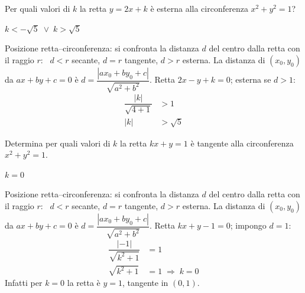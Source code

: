 \begin{question}[ID=3.8, subtitle={Valori di $k$ per cui $y=2x+k$ è esterna a $x^2+y^2=1$}, difficulty=media, tags={parametrico, retta, circonferenza}]
Per quali valori di $k$ la retta $y=2x+k$ è esterna alla circonferenza $x^2+y^2=1$?
\begin{solution}
$k<-\sqrt5 \;\vee\; k>\sqrt5$
\end{solution}
\begin{explanation}
Posizione retta–circonferenza: si confronta la distanza $d$ del centro dalla retta con il raggio $r$: \ $d<r$ secante, $d=r$ tangente, $d>r$ esterna. La distanza di $(x_0,y_0)$ da $ax+by+c=0$ è $d=\dfrac{|ax_0+by_0+c|}{\sqrt{a^2+b^2}}$.
Retta $2x-y+k=0$; esterna se $d>1$:
\[\begin{aligned}
\dfrac{|k|}{\sqrt{4+1}} &> 1\\
|k| &> \sqrt5
\end{aligned}\]
\end{explanation}
\end{question}


\begin{question}[ID=3.9, subtitle={Valori di $k$ per cui $kx+y=1$ è tangente alla circonferenza unitaria}, difficulty=difficile, tags={parametrico, tangente}]
Determina per quali valori di $k$ la retta $kx+y=1$ è tangente alla circonferenza $x^2+y^2=1$.
\begin{solution}
$k=0$
\end{solution}
\begin{explanation}
Posizione retta–circonferenza: si confronta la distanza $d$ del centro dalla retta con il raggio $r$: \ $d<r$ secante, $d=r$ tangente, $d>r$ esterna. La distanza di $(x_0,y_0)$ da $ax+by+c=0$ è $d=\dfrac{|ax_0+by_0+c|}{\sqrt{a^2+b^2}}$.
Retta $kx+y-1=0$; impongo $d=1$:
\[\begin{aligned}
\dfrac{|-1|}{\sqrt{k^2+1}} &= 1\\
\sqrt{k^2+1} &= 1 \;\Rightarrow\; k=0
\end{aligned}\]
Infatti per $k=0$ la retta è $y=1$, tangente in $(0,1)$.
\end{explanation}
\end{question}


